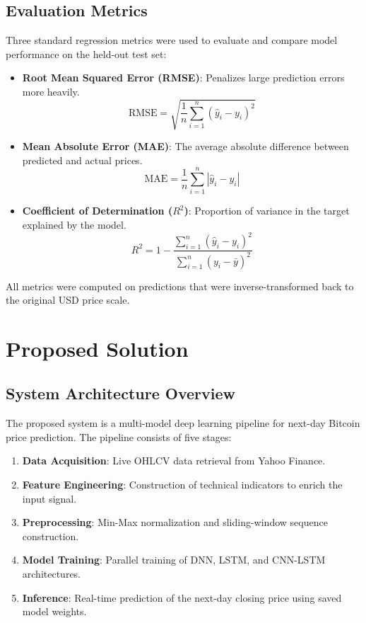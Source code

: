 \documentclass[12pt]{article}
\begin{document}
\subsection{Evaluation Metrics}

Three standard regression metrics were used to evaluate and compare model performance on the held-out test set:

\begin{itemize}[leftmargin=*]
    \item \textbf{Root Mean Squared Error (RMSE)}: Penalizes large prediction errors more heavily.
    \begin{equation}
        \text{RMSE} = \sqrt{\frac{1}{n}\sum_{i=1}^{n}(\hat{y}_i - y_i)^2}
    \end{equation}
    \item \textbf{Mean Absolute Error (MAE)}: The average absolute difference between predicted and actual prices.
    \begin{equation}
        \text{MAE} = \frac{1}{n}\sum_{i=1}^{n}|\hat{y}_i - y_i|
    \end{equation}
    \item \textbf{Coefficient of Determination ($R^2$)}: Proportion of variance in the target explained by the model.
    \begin{equation}
        R^2 = 1 - \frac{\sum_{i=1}^{n}(\hat{y}_i - y_i)^2}{\sum_{i=1}^{n}(y_i - \bar{y})^2}
    \end{equation}
\end{itemize}

All metrics were computed on predictions that were inverse-transformed back to the original USD price scale.

\section{Proposed Solution}

\subsection{System Architecture Overview}

The proposed system is a multi-model deep learning pipeline for next-day Bitcoin price prediction. The pipeline consists of five stages:

\begin{enumerate}[leftmargin=*]
    \item \textbf{Data Acquisition}: Live OHLCV data retrieval from Yahoo Finance.
    \item \textbf{Feature Engineering}: Construction of technical indicators to enrich the input signal.
    \item \textbf{Preprocessing}: Min-Max normalization and sliding-window sequence construction.
    \item \textbf{Model Training}: Parallel training of DNN, LSTM, and CNN-LSTM architectures.
    \item \textbf{Inference}: Real-time prediction of the next-day closing price using saved model weights.
\end{enumerate}
\end{document}
